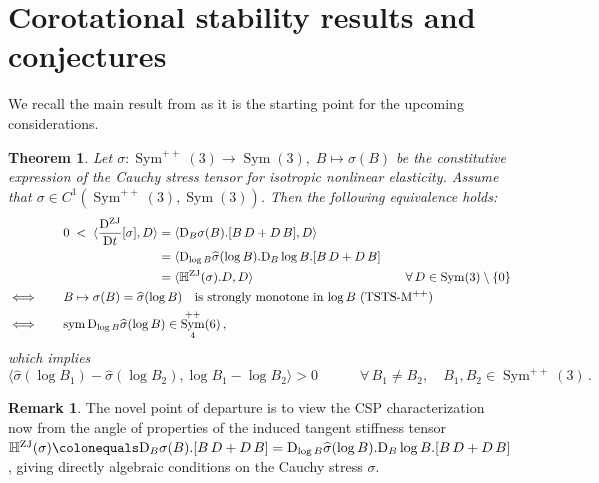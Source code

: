 \documentclass[10pt]{article}
\newcounter{theoremCounter}
\numberwithin{theoremCounter}{section}
\theoremstyle{plain}
\newtheorem{thm}[theoremCounter]{Theorem}
\theoremstyle{definition}
\newtheorem{rem}[theoremCounter]{Remark}
\newcommand{\DD}{\mathrm{D}}
\DeclareMathOperator{\Sym}{Sym}
\DeclareMathOperator{\sym}{sym}
\DeclareMathOperator{\ZJ}{ZJ}
\def\H{\mathbb{H}}
\numberwithin{equation}{section}
\begin{document}
%
\section{Corotational stability results and conjectures} \label{sec5}
%
We recall the main result from \cite{tobedone} as it is the starting point for the upcoming considerations.
	\begin{thm} \label{thm4.3}
	Let $\sigma\colon \Sym^{++}(3) \to \Sym(3), \; B \mapsto \sigma(B)$ be the constitutive expression of the Cauchy stress tensor for isotropic nonlinear elasticity. Assume that $\sigma \in C^1(\Sym^{++}(3), \Sym(3))$. Then the following equivalence holds:
	\begin{equation}
		\begin{alignedat}{2}
		&0 \;<\; \langle \frac{\DD^{\ZJ}}{\DD t}[\sigma], D \rangle &&= \langle \DD_B \sigma(B) . [B \, D + D \, B] , D \rangle \\&&&= \langle \DD_{\log B} \widehat \sigma(\log B). \DD_B \log B. [B \, D + D \, B] \\
		&&&= \mathrlap{\langle \H^{\ZJ}(\sigma).D, D \rangle} \hphantom{\langle \DD_{\log B} \widehat \sigma(\log B). \DD_B \log B. [B \, D + D \, B]} \qquad \forall \, D \in \Sym(3) \setminus \{0\} \\
		\iff \qquad &\mathrlap{B \mapsto \sigma(B) = \widehat{\sigma}(\log B) \quad \textnormal{is strongly monotone in $\log B$ (TSTS-M$^{++}$)}} \\
		\iff \qquad &\mathrlap{\sym \DD_{\log B} \widehat \sigma(\log B) \in \Sym^{++}_4(6)\,,}
		\end{alignedat}
	\end{equation}
	which implies
		\begin{equation}
		\label{eqappendix11}
		\langle \widehat{\sigma}(\log B_1) - \widehat{\sigma}(\log B_2), \log B_1 - \log B_2 \rangle > 0 \qquad \quad \forall \, B_1 \neq B_2, \quad B_1, B_2 \in \Sym^{++}(3)\,.
		\end{equation}
	\end{thm}
%
\begin{rem}
The novel point of departure is to view the CSP characterization now from the angle of properties of the induced tangent stiffness tensor $\H^{\ZJ}(\sigma)\colonequals \DD_B \sigma(B). [B \, D + D \, B] = \DD_{\log B} \widehat \sigma(\log B). \DD_B \log B.[B \, D + D \, B]$, giving directly algebraic conditions on the Cauchy stress $\sigma$.
\end{rem}
%
\end{document}
